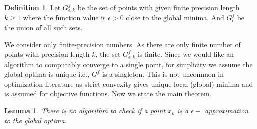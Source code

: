 \documentclass[a4paper,11pt]{article}
\newtheorem{lemma}[theorem]{Lemma}
\theoremstyle{definition}
\newtheorem{definition}[theorem]{Definition}
\theoremstyle{remark}
\begin{document}
	\begin{definition}
		Let $G^f_{\epsilon,k}$ be the set of points with given finite precision length $k \geq 1$ where the function value is $\epsilon > 0$ close to the global minima. And $G^f_{\epsilon}$ be the union of all such sets.
	\end{definition} %
	We consider only finite-precision numbers. %
	As there are only finite number of points with precision length $k$, the set $G^f_{\epsilon,k}$ is finite. 
	Since we would like an algorithm to computably converge to a single point, for simplicity we assume the global optima is unique i.e., $G^f$ is a singleton. This is not uncommon in optimization literature as strict convexity gives unique local (global) minima and is assumed for objective functions. Now we state the main theorem.
	
	\begin{lemma}\label{checklem}
		There is no algorithm to check if a point $x_k$ is a $\epsilon-$ approximation  to the global optima.
	\end{lemma}
	
\end{document}

